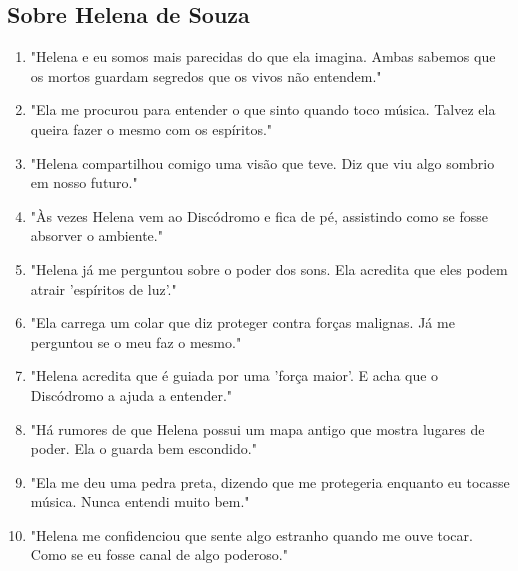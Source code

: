 \subsection*{Sobre Helena de Souza}
\begin{enumerate}
    \item "Helena e eu somos mais parecidas do que ela imagina. Ambas sabemos que os mortos guardam segredos que os vivos não entendem."
    \item "Ela me procurou para entender o que sinto quando toco música. Talvez ela queira fazer o mesmo com os espíritos."
    \item "Helena compartilhou comigo uma visão que teve. Diz que viu algo sombrio em nosso futuro."
    \item "Às vezes Helena vem ao Discódromo e fica de pé, assistindo como se fosse absorver o ambiente."
    \item "Helena já me perguntou sobre o poder dos sons. Ela acredita que eles podem atrair 'espíritos de luz'."
    \item "Ela carrega um colar que diz proteger contra forças malignas. Já me perguntou se o meu faz o mesmo."
    \item "Helena acredita que é guiada por uma 'força maior'. E acha que o Discódromo a ajuda a entender."
    \item "Há rumores de que Helena possui um mapa antigo que mostra lugares de poder. Ela o guarda bem escondido."
    \item "Ela me deu uma pedra preta, dizendo que me protegeria enquanto eu tocasse música. Nunca entendi muito bem."
    \item "Helena me confidenciou que sente algo estranho quando me ouve tocar. Como se eu fosse canal de algo poderoso."
\end{enumerate}

